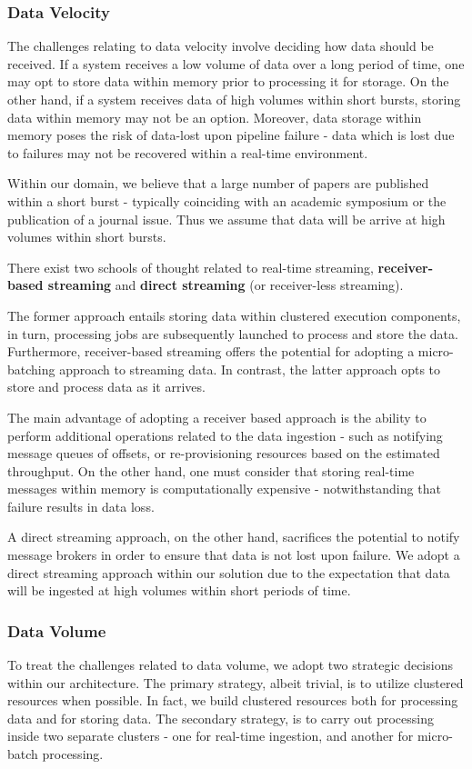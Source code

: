 \documentclass[10pt,journal,final,a4paper]{IEEEtran}
\begin{document}
\subsubsection{Data Velocity}
The challenges relating to data velocity involve deciding how data should be received. If a system receives a low volume of data over a long period of time, one may opt to store data within memory prior to processing it for storage. On the other hand, if a system receives data of high volumes within short bursts, storing data within memory may not be an option. Moreover, data storage within memory poses the risk of data-lost upon pipeline failure - data which is lost due to failures may not be recovered within a real-time environment.

Within our domain, we believe that a large number of papers are published within a short burst - typically coinciding with an academic symposium or the publication of a journal issue. Thus we assume that data will be arrive at high volumes within short bursts.

There exist two schools of thought related to real-time streaming, \textbf{receiver-based streaming} and \textbf{direct streaming} (or receiver-less streaming)\cite{spark_streaming}.

The former approach entails storing data within clustered execution components, in turn, processing jobs are subsequently launched to process and store the data. Furthermore, receiver-based streaming offers the potential for adopting a micro-batching approach to streaming data. In contrast, the latter approach opts to store and process data as it arrives. 

The main advantage of adopting a receiver based approach is the ability to perform additional operations related to the data ingestion - such as notifying message queues of offsets, or re-provisioning resources based on the estimated throughput. On the other hand, one must consider that storing real-time messages within memory is computationally expensive - notwithstanding that failure results in data loss.

A direct streaming approach, on the other hand, sacrifices the potential to notify message brokers in order to ensure that data is not lost upon failure. We adopt a direct streaming approach within our solution due to the expectation that data will be ingested at high volumes within short periods of time.

\subsubsection{Data Volume}
To treat the challenges related to data volume, we adopt two strategic decisions within our architecture. The primary strategy, albeit trivial, is to utilize clustered resources when possible. In fact, we build clustered resources both for processing data and for storing data. The secondary strategy, is to carry out processing inside two separate clusters - one for real-time ingestion, and another for micro-batch processing.
\end{document}
